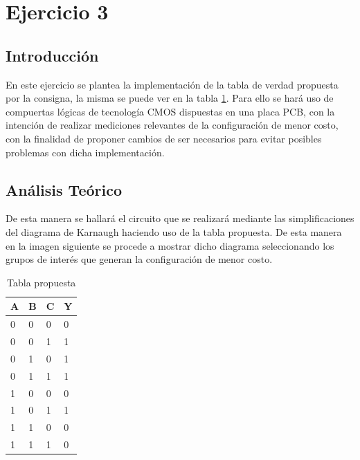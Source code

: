 \section{Ejercicio 3}
\subsection{Introducci\'on}
\noindent
En este ejercicio se plantea la implementaci\'on de la tabla de verdad propuesta por la consigna, la misma se puede ver en la tabla \ref{ej3_tabla_de_verdad}. Para ello se hará uso de compuertas lógicas de tecnología CMOS dispuestas en una placa PCB, con la intención de realizar mediciones relevantes de la configuración de menor costo, con la finalidad de proponer cambios de ser necesarios para evitar posibles problemas con dicha implementación. 
%
\subsection{An\'alisis Te\'orico}
\noindent
De esta manera se hallar\'a el circuito que se realizar\'a mediante las simplificaciones del diagrama de Karnaugh haciendo uso de la tabla propuesta. De esta manera en la imagen siguiente se procede a mostrar dicho diagrama seleccionando los grupos de inter\'es que generan la configuraci\'on de menor costo.
%
\begin{table}[H]
\caption{Tabla propuesta}
\label{ej3_tabla_de_verdad}
\centering
\begin{tabular}{|l|l|l||l|}
\hline
A & B & C & Y \\ \hline \hline
0 & 0 & 0 & 0 \\ \hline
0 & 0 & 1 & 1 \\ \hline
0 & 1 & 0 & 1 \\ \hline
0 & 1 & 1 & 1 \\ \hline
1 & 0 & 0 & 0 \\ \hline
1 & 0 & 1 & 1 \\ \hline
1 & 1 & 0 & 0 \\ \hline
1 & 1 & 1 & 0 \\ \hline
\end{tabular}
\end{table}
%
\begin{center}
    \begin{Karnaughvuit}
    \end{Karnaughvuit}
\end{center}
